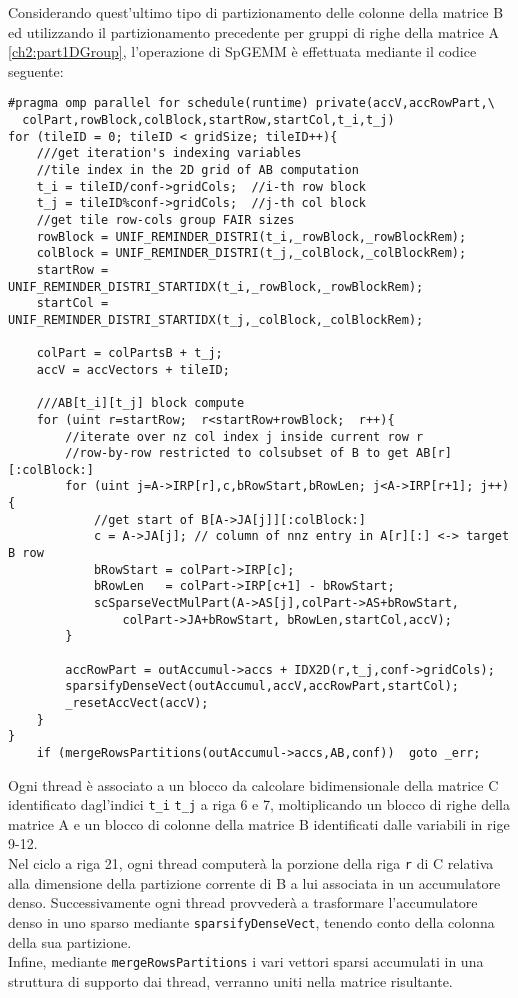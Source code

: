 Considerando quest'ultimo tipo di partizionamento delle colonne della matrice B 
ed utilizzando il partizionamento precedente per gruppi di righe della matrice A
\ref{ch2:part1DGroup}, l'operazione di SpGEMM è effettuata mediante il codice seguente:
\begin{lstlisting}
#pragma omp parallel for schedule(runtime) private(accV,accRowPart,\
  colPart,rowBlock,colBlock,startRow,startCol,t_i,t_j)
for (tileID = 0; tileID < gridSize; tileID++){
    ///get iteration's indexing variables
    //tile index in the 2D grid of AB computation 
    t_i = tileID/conf->gridCols;  //i-th row block
    t_j = tileID%conf->gridCols;  //j-th col block
    //get tile row-cols group FAIR sizes
    rowBlock = UNIF_REMINDER_DISTRI(t_i,_rowBlock,_rowBlockRem); 
    colBlock = UNIF_REMINDER_DISTRI(t_j,_colBlock,_colBlockRem);
    startRow = UNIF_REMINDER_DISTRI_STARTIDX(t_i,_rowBlock,_rowBlockRem);
    startCol = UNIF_REMINDER_DISTRI_STARTIDX(t_j,_colBlock,_colBlockRem);
    
    colPart = colPartsB + t_j;
    accV = accVectors + tileID; 
     
    ///AB[t_i][t_j] block compute
    for (uint r=startRow;  r<startRow+rowBlock;  r++){
        //iterate over nz col index j inside current row r
        //row-by-row restricted to colsubset of B to get AB[r][:colBlock:]
        for (uint j=A->IRP[r],c,bRowStart,bRowLen; j<A->IRP[r+1]; j++){
            //get start of B[A->JA[j]][:colBlock:]
            c = A->JA[j]; // column of nnz entry in A[r][:] <-> target B row
            bRowStart = colPart->IRP[c];
            bRowLen   = colPart->IRP[c+1] - bRowStart;
            scSparseVectMulPart(A->AS[j],colPart->AS+bRowStart,
                colPart->JA+bRowStart, bRowLen,startCol,accV);
        }

        accRowPart = outAccumul->accs + IDX2D(r,t_j,conf->gridCols);
        sparsifyDenseVect(outAccumul,accV,accRowPart,startCol);
        _resetAccVect(accV);
    }
}
    if (mergeRowsPartitions(outAccumul->accs,AB,conf))  goto _err;
\end{lstlisting}
Ogni thread è associato a un blocco da calcolare bidimensionale della matrice C
identificato dagl'indici \verb|t_i| \verb|t_j| a riga 6 e 7,
moltiplicando un blocco di righe della matrice A e un blocco di colonne della matrice
B identificati dalle variabili in rige 9-12.\\
Nel ciclo a riga 21, ogni thread computerà la porzione della riga \verb|r| di C
relativa alla dimensione della partizione corrente di B a lui associata in un
accumulatore denso.
Successivamente ogni thread provvederà a trasformare l'accumulatore denso in uno
sparso mediante \verb|sparsifyDenseVect|, tenendo conto della colonna della
sua partizione.\\
Infine, mediante \verb|mergeRowsPartitions| i vari vettori sparsi accumulati
in una struttura di supporto dai thread, verranno uniti nella matrice risultante.\\
